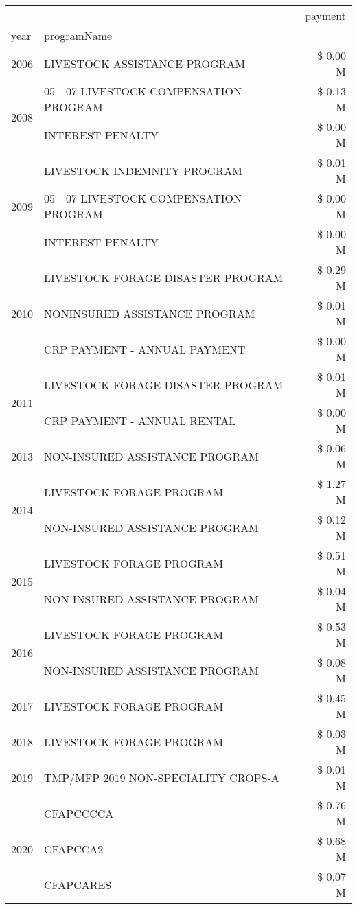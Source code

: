 \begin{tabular}{llr}
\toprule
 &  & payment \\
year & programName &  \\
\midrule
2006 & LIVESTOCK ASSISTANCE PROGRAM & \$ 0.00 M \\
\cline{1-3}
\multirow[t]{2}{*}{2008} & 05 - 07 LIVESTOCK COMPENSATION PROGRAM & \$ 0.13 M \\
 & INTEREST PENALTY & \$ 0.00 M \\
\cline{1-3}
\multirow[t]{3}{*}{2009} & LIVESTOCK INDEMNITY PROGRAM & \$ 0.01 M \\
 & 05 - 07 LIVESTOCK COMPENSATION PROGRAM & \$ 0.00 M \\
 & INTEREST PENALTY & \$ 0.00 M \\
\cline{1-3}
\multirow[t]{3}{*}{2010} & LIVESTOCK FORAGE DISASTER  PROGRAM & \$ 0.29 M \\
 & NONINSURED ASSISTANCE PROGRAM & \$ 0.01 M \\
 & CRP PAYMENT - ANNUAL PAYMENT & \$ 0.00 M \\
\cline{1-3}
\multirow[t]{2}{*}{2011} & LIVESTOCK FORAGE DISASTER PROGRAM & \$ 0.01 M \\
 & CRP PAYMENT - ANNUAL RENTAL & \$ 0.00 M \\
\cline{1-3}
2013 & NON-INSURED ASSISTANCE PROGRAM & \$ 0.06 M \\
\cline{1-3}
\multirow[t]{2}{*}{2014} & LIVESTOCK FORAGE PROGRAM & \$ 1.27 M \\
 & NON-INSURED ASSISTANCE PROGRAM & \$ 0.12 M \\
\cline{1-3}
\multirow[t]{2}{*}{2015} & LIVESTOCK FORAGE PROGRAM & \$ 0.51 M \\
 & NON-INSURED ASSISTANCE PROGRAM & \$ 0.04 M \\
\cline{1-3}
\multirow[t]{2}{*}{2016} & LIVESTOCK FORAGE PROGRAM                      & \$ 0.53 M \\
 & NON-INSURED ASSISTANCE PROGRAM                & \$ 0.08 M \\
\cline{1-3}
2017 & LIVESTOCK FORAGE PROGRAM & \$ 0.45 M \\
\cline{1-3}
2018 & LIVESTOCK FORAGE PROGRAM & \$ 0.03 M \\
\cline{1-3}
2019 & TMP/MFP 2019 NON-SPECIALITY CROPS-A & \$ 0.01 M \\
\cline{1-3}
\multirow[t]{3}{*}{2020} & CFAPCCCCA & \$ 0.76 M \\
 & CFAPCCA2 & \$ 0.68 M \\
 & CFAPCARES & \$ 0.07 M \\
\cline{1-3}
\bottomrule
\end{tabular}
